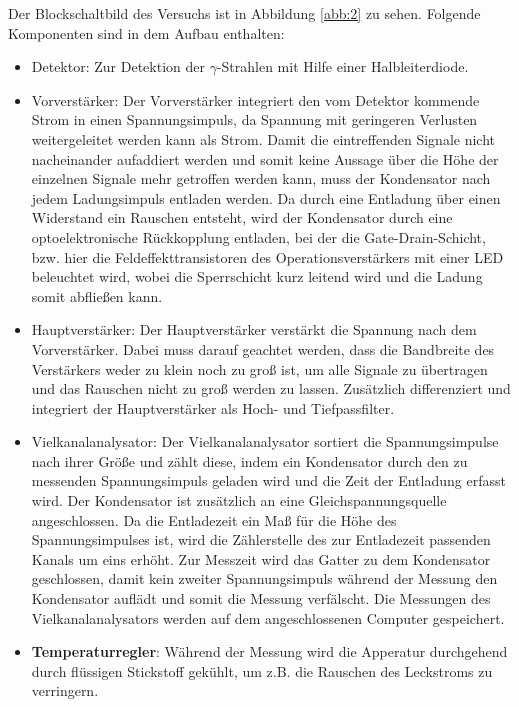 Der Blockschaltbild des Versuchs ist in Abbildung \ref{abb:2} zu sehen. Folgende
Komponenten sind in dem Aufbau enthalten:
\begin{itemize}
  \item Detektor: Zur Detektion der $\gamma$-Strahlen mit Hilfe
  einer Halbleiterdiode.
  \item Vorverstärker: Der Vorverstärker integriert den vom Detektor
  kommende Strom in einen Spannungsimpuls, da Spannung mit geringeren
  Verlusten weitergeleitet werden kann als Strom. Damit die eintreffenden Signale
  nicht nacheinander aufaddiert werden und somit keine Aussage über die Höhe der
  einzelnen Signale mehr getroffen werden kann, muss der Kondensator nach jedem
  Ladungsimpuls entladen werden. Da durch eine
  Entladung über einen Widerstand ein Rauschen entsteht, wird der Kondensator
  durch eine optoelektronische Rückkopplung entladen, bei der die Gate-Drain-Schicht,
  bzw. hier die Feldeffekttransistoren
  des Operationsverstärkers mit einer LED beleuchtet wird, wobei die
  Sperrschicht kurz leitend wird und die Ladung somit abfließen kann.
  \item Hauptverstärker: Der Hauptverstärker verstärkt die Spannung
  nach dem Vorverstärker. Dabei muss darauf geachtet werden, dass die Bandbreite
  des Verstärkers weder zu klein noch zu groß ist, um alle Signale zu
  übertragen und das Rauschen nicht zu groß werden zu lassen.
  Zusätzlich differenziert und integriert der Hauptverstärker als Hoch- und
  Tiefpassfilter.
  \item Vielkanalanalysator: Der Vielkanalanalysator sortiert
  die Spannungsimpulse nach ihrer Größe und zählt diese, indem ein Kondensator
  durch den zu messenden Spannungsimpuls geladen wird und die Zeit der
  Entladung erfasst wird. Der Kondensator ist zusätzlich an eine
  Gleichspannungsquelle angeschlossen. Da die Entladezeit ein Maß für die
  Höhe des Spannungsimpulses ist, wird die Zählerstelle des zur Entladezeit
  passenden Kanals um eins erhöht. Zur Messzeit wird das Gatter zu dem Kondensator
  geschlossen, damit kein zweiter Spannungsimpuls während der Messung
  den Kondensator auflädt und somit die Messung verfälscht.
  Die Messungen des Vielkanalanalysators werden auf dem angeschlossenen
  Computer gespeichert.
  \item \textbf{Temperaturregler}: Während der Messung wird die Apperatur
  durchgehend durch flüssigen Stickstoff gekühlt, um z.B. die Rauschen des
  Leckstroms zu verringern.
\end{itemize}

